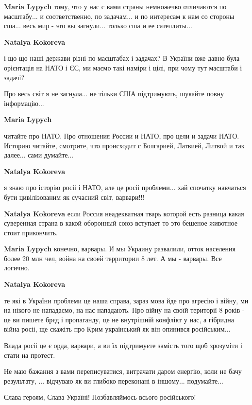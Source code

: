 \begin{itemize}
\begin{itemize}
\textbf{Maria Lypych} тому, что у нас с вами страны немножечко отличаются по масштабу... и соответственно, по задачам... и по интересам к нам со стороны сша... весь мир - это вы загнули... только сша и ее сателлиты...

\textbf{Natalya Kokoreva} 

і що що наші держави різні по масштабах і задачах? В України вже давно була
орієнтація на НАТО і ЄС, ми маємо такі наміри і цілі, при чому тут масштаби і
задачі?

Про весь світ я не загнула... не тільки США підтримують, шукайте повну інформацію...

\textbf{Maria Lypych} 

читайте про НАТО. Про отношения России и НАТО, про цели и задачи НАТО. Историю
читайте, смотрите, что происходит с Болгарией, Латвией, Литвой и так далее...
сами думайте...

\textbf{Natalya Kokoreva} 

я знаю про історію росіі і НАТО, але це росіі проблеми... хай спочатку
навчаться бути цивілізованим як сучасний світ, варвари!!!


\textbf{Natalya Kokoreva} если Россия неадекватная тварь которой есть разница какая суверенная страна в какой оборонный союз вступает то это бешеное животное стоит прикончить.

\textbf{Maria Lypych} конечно, варвары. И мы Украину развалили, отток населения более 20 млн чел, война на своей территории 8 лет. А мы - варвары. Все логично.

\textbf{Natalya Kokoreva} 

те які в України проблеми це наша справа, зараз мова йде про агресію і війну,
ми на нікого не нападаємо, на нас нападають. Про війну на своїй території 8
років - це ви пишете брєд і пропаганду, це не внутрішній конфлікт у нас, а
гібридна війна росіі, ще скажіть про Крим український як він опинився
російським...

Влада росіі це є орда, варвари, а ви їх підтримуєте замість того щоб зрозуміти
і стати на протест.

Не маю бажання з вами переписуватися, витрачати даром енергію, коли не бачу
результату, ... відчуваю як ви глибоко переконані в іншому... подумайте...

\end{itemize} %

Слава героям, Слава Україні! Позбавляймось всього російського!


\end{itemize}
